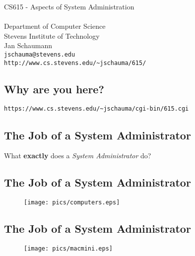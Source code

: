 \documentclass[xga]{xdvislides}
\begin{document}
\setfontphv

\lhead{\slidetitle}				%
\cfoot{\relax}					%
\rfoot{\Gray{\today}}

\vspace*{\fill}
\begin{center}
	\Hugesize
		CS615 - Aspects of System Administration\\ [1em]
	\hspace*{5mm}\blueline\\ [1em]
	\Normalsize
		Department of Computer Science\\
		Stevens Institute of Technology\\
		Jan Schaumann\\
		\verb+jschauma@stevens.edu+ \\
		\verb+http://www.cs.stevens.edu/~jschauma/615/+
\end{center}
\vspace*{\fill}

\subsection{Why are you here?}

\vspace*{\fill}
\Hugesize
{\tt https://www.cs.stevens.edu/\~{}jschauma/cgi-bin/615.cgi}
\Normalsize
\vspace*{\fill}

\subsection{The Job of a System Administrator}
What {\bf exactly} does a {\em System Administrator} do?

\subsection{The Job of a System Administrator}
\begin{figure}[hb]
	\begin{center}
		\texttt{[image: pics/computers.eps]} \\
	\end{center}
\end{figure}

\subsection{The Job of a System Administrator}
\vspace*{\fill}
\begin{figure}[hb]
	\begin{center}
		\texttt{[image: pics/macmini.eps]} \\
	\end{center}
\end{figure}
\vspace*{\fill}
\end{document}

